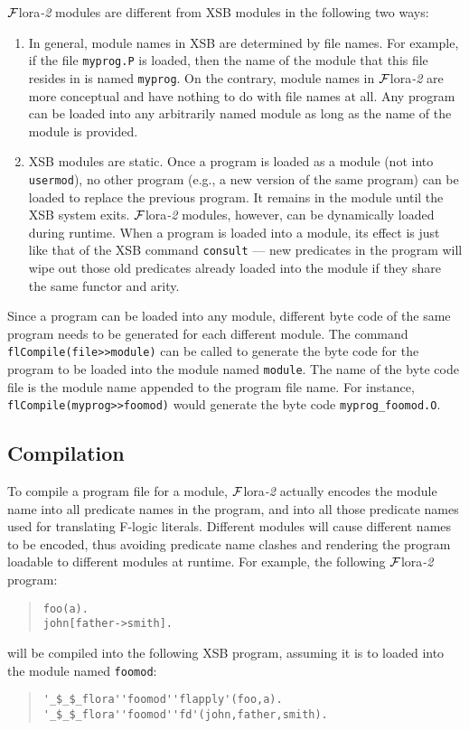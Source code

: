 \documentclass[11pt]{article}
\newcommand{\FLORA}{{\mbox{${\cal F}${\sc lora}\rm\emph{-2}}}\xspace}
\newcommand{\fl}{\mbox{F-logic}\xspace}
\begin{document}
%
\FLORA modules are different from XSB modules in the following two
ways:
\begin{enumerate}
\item In general, module names in XSB are determined by file names.
      For example, if the file {\tt myprog.P} is loaded, then the name
      of the module that this file resides in is named {\tt myprog}.
      On the contrary, module names in \FLORA are more conceptual and
      have nothing to do with file names at all. Any program can be
      loaded into any arbitrarily named module as long as the name of
      the module is provided.

\item XSB modules are static. Once a program is loaded as a module (not
      into {\tt usermod}), no other program (e.g., a new version of
      the same program) can be loaded to replace the previous program.
      It remains in the module until the XSB system exits. \FLORA modules,
      however, can be dynamically loaded during runtime. When a program
      is loaded into a module, its effect is just like that of the XSB
      command {\tt consult} --- new predicates in the program will wipe
      out those old predicates already loaded into the module if they
      share the same functor and arity.
\end{enumerate}

Since a program can be loaded into any module, different byte code of
the same program needs to be generated for each different module.  The
command {\tt flCompile(file>>module)} can be called to generate the
byte code for the program to be loaded into the module named
{\tt module}. The name of the byte code file is the module name appended
to the program file name. For instance, {\tt flCompile(myprog>>foomod)}
would generate the byte code {\tt myprog\_foomod.O}.


\subsection{Compilation} \label{sec:flora-modules-compilation}


%
To compile a program file for a module, \FLORA actually encodes the
module name into all predicate names in the program, and into all
those predicate names used for translating \fl literals. Different
modules will cause different names to be encoded, thus avoiding
predicate name clashes and rendering the program loadable to different
modules at runtime.  For example, the following \FLORA program:
\begin{quote}
\begin{verbatim}
foo(a).
john[father->smith].
\end{verbatim}
\end{quote}
will be compiled into the following XSB program, assuming it is to
loaded into the module named {\tt foomod}:
\begin{quote}
\begin{verbatim}
'_$_$_flora''foomod''flapply'(foo,a).
'_$_$_flora''foomod''fd'(john,father,smith).
\end{verbatim}
\end{quote}
\end{document}
